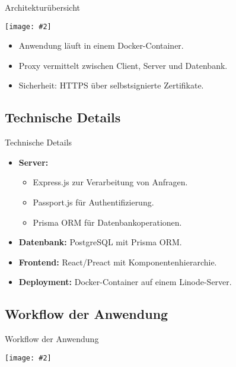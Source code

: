 \documentclass{beamer}
\newcommand{\centfig}[2]{\begin{center}
  \texttt{[image: \#2]}
  \end{center}}
\begin{document}
\begin{frame}{Architekturübersicht}
    \centfig{0.3}{docker-container.png}
    \begin{itemize}
        \item<1-> Anwendung läuft in einem Docker-Container.
        \item<2-> Proxy vermittelt zwischen Client, Server und Datenbank.
        \item<3-> Sicherheit: HTTPS über selbstsignierte Zertifikate.
    \end{itemize}
\end{frame}

\subsection{Technische Details}
\begin{frame}{Technische Details}
    \begin{itemize}
        \item<1-> \textbf{Server:}
        \begin{itemize}
            \item Express.js zur Verarbeitung von Anfragen.
            \item Passport.js für Authentifizierung.
            \item Prisma ORM für Datenbankoperationen.
        \end{itemize}
        \item<2-> \textbf{Datenbank:} PostgreSQL mit Prisma ORM.
        \item<3-> \textbf{Frontend:} React/Preact mit Komponentenhierarchie.
        \item<4-> \textbf{Deployment:} Docker-Container auf einem Linode-Server.
    \end{itemize}
\end{frame}

\subsection{Workflow der Anwendung}
\begin{frame}{Workflow der Anwendung}
    \centfig{0.7}{web-app-workflow.png}
\end{frame}
\end{document}
